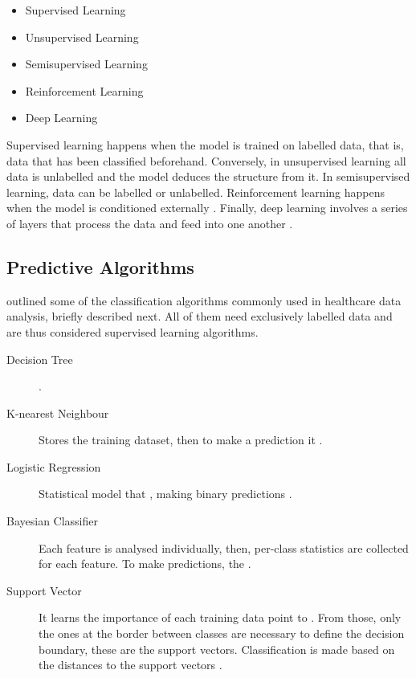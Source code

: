 \documentclass[a4paper,12pt]{article}
\begin{document}
\begin{itemize}
 \item Supervised Learning
 \item Unsupervised Learning
 \item Semisupervised Learning
 \item Reinforcement Learning
 \item Deep Learning
\end{itemize}

Supervised learning happens when the model is trained on labelled data, that is, data that has been classified beforehand.
Conversely, in unsupervised learning all data is unlabelled and the model deduces the structure from it. In semisupervised learning, data can be labelled or unlabelled.
Reinforcement learning happens when the model is conditioned externally \parencite[11]{Ibrahim2021}.
Finally, deep learning involves a series of layers that process the data and feed into one another \parencite[13]{Ibrahim2021}.

\subsection{Predictive Algorithms}


\textcite{Jothi2015} outlined some of the classification algorithms commonly used in healthcare data analysis, briefly described next. All of them need exclusively labelled data and are thus considered supervised learning algorithms.

\begin{description}
    \item[Decision Tree] .
    \item[K-nearest Neighbour] Stores the training dataset, then to make a prediction it .
    \item[Logistic Regression] Statistical model that , making binary predictions \parencite{Nick2007}.
    \item[Bayesian Classifier] Each feature is analysed individually, then, per-class statistics are collected for each feature. 
    To make predictions, the .
    \item[Support Vector] It learns the importance of each training data point to .
    From those, only the ones at the border between classes are necessary to define the decision boundary, these are the support vectors.
    Classification is made based on the distances to the support vectors \parencite[98]{Mueller2017}.
\end{description}
\end{document}
